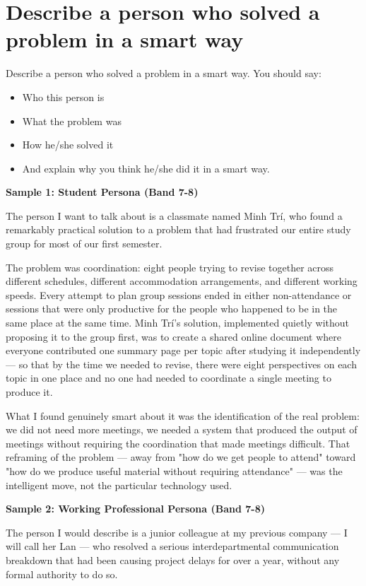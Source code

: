 \section{Describe a person who solved a problem in a smart way}
\begin{ieltsprompt}
Describe a person who solved a problem in a smart way.
You should say:
\begin{itemize}[leftmargin=2em, itemsep=2pt]
\item Who this person is
\item What the problem was
\item How he/she solved it
\item And explain why you think he/she did it in a smart way.
\end{itemize}
\end{ieltsprompt}
\begin{ieltsanswer}
\textbf{Sample 1: Student Persona (Band 7-8)}

The person I want to talk about is a classmate named Minh Trí, who found a remarkably practical solution to a problem that had frustrated our entire study group for most of our first semester.

The problem was coordination: eight people trying to revise together across different schedules, different accommodation arrangements, and different working speeds. Every attempt to plan group sessions ended in either non-attendance or sessions that were only productive for the people who happened to be in the same place at the same time. Minh Trí's solution, implemented quietly without proposing it to the group first, was to create a shared online document where everyone contributed one summary page per topic after studying it independently — so that by the time we needed to revise, there were eight perspectives on each topic in one place and no one had needed to coordinate a single meeting to produce it.

What I found genuinely smart about it was the identification of the real problem: we did not need more meetings, we needed a system that produced the output of meetings without requiring the coordination that made meetings difficult. That reframing of the problem — away from "how do we get people to attend" toward "how do we produce useful material without requiring attendance" — was the intelligent move, not the particular technology used.

\textbf{Sample 2: Working Professional Persona (Band 7-8)}

The person I would describe is a junior colleague at my previous company — I will call her Lan — who resolved a serious interdepartmental communication breakdown that had been causing project delays for over a year, without any formal authority to do so.


\end{ieltsanswer}
